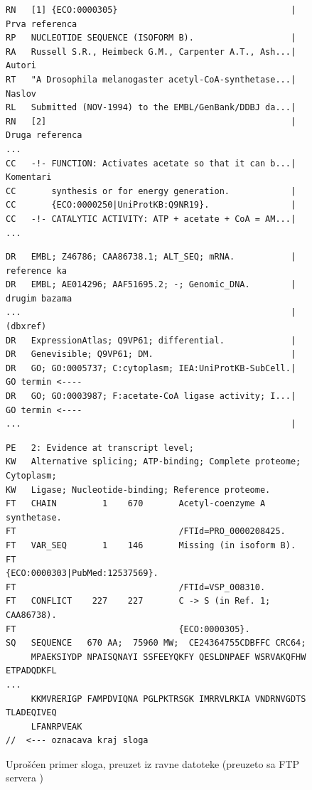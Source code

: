 \begin{figure}[h!]
\begin{lstlisting}[firstnumber=7,   basicstyle=\footnotesize\ttfamily\color{gray}]
RN   [1] {ECO:0000305}                                  | Prva referenca
RP   NUCLEOTIDE SEQUENCE (ISOFORM B).                   | 
RA   Russell S.R., Heimbeck G.M., Carpenter A.T., Ash...| Autori
RT   "A Drosophila melanogaster acetyl-CoA-synthetase...| Naslov
RL   Submitted (NOV-1994) to the EMBL/GenBank/DDBJ da...|
RN   [2]                                                | Druga referenca              
...                                                     
CC   -!- FUNCTION: Activates acetate so that it can b...| Komentari
CC       synthesis or for energy generation.            |
CC       {ECO:0000250|UniProtKB:Q9NR19}.                |
CC   -!- CATALYTIC ACTIVITY: ATP + acetate + CoA = AM...|
...                                                     
\end{lstlisting}
\begin{lstlisting}[firstnumber=30]
DR   EMBL; Z46786; CAA86738.1; ALT_SEQ; mRNA.           | reference ka
DR   EMBL; AE014296; AAF51695.2; -; Genomic_DNA.        | drugim bazama 
...                                                     | (dbxref)
DR   ExpressionAtlas; Q9VP61; differential.             |
DR   Genevisible; Q9VP61; DM.                           |
DR   GO; GO:0005737; C:cytoplasm; IEA:UniProtKB-SubCell.| GO termin <----
DR   GO; GO:0003987; F:acetate-CoA ligase activity; I...| GO termin <----
...                                                     |
\end{lstlisting}
\begin{lstlisting}[firstnumber=38]
PE   2: Evidence at transcript level;
KW   Alternative splicing; ATP-binding; Complete proteome; Cytoplasm; 
KW   Ligase; Nucleotide-binding; Reference proteome.                  
FT   CHAIN         1    670       Acetyl-coenzyme A synthetase.
FT                                /FTId=PRO_0000208425.
FT   VAR_SEQ       1    146       Missing (in isoform B).
FT                                {ECO:0000303|PubMed:12537569}.
FT                                /FTId=VSP_008310.
FT   CONFLICT    227    227       C -> S (in Ref. 1; CAA86738).
FT                                {ECO:0000305}.
SQ   SEQUENCE   670 AA;  75960 MW;  CE24364755CDBFFC CRC64;
     MPAEKSIYDP NPAISQNAYI SSFEEYQKFY QESLDNPAEF WSRVAKQFHW ETPADQDKFL
...
     KKMVRERIGP FAMPDVIQNA PGLPKTRSGK IMRRVLRKIA VNDRNVGDTS TLADEQIVEQ
     LFANRPVEAK
//  <--- oznacava kraj sloga
\end{lstlisting}
\caption{Uprošćen primer sloga, preuzet iz ravne datoteke  \footnotesize (preuzeto sa FTP servera \cite{sprot})  }
\label{fig:slog}
\end{figure}


